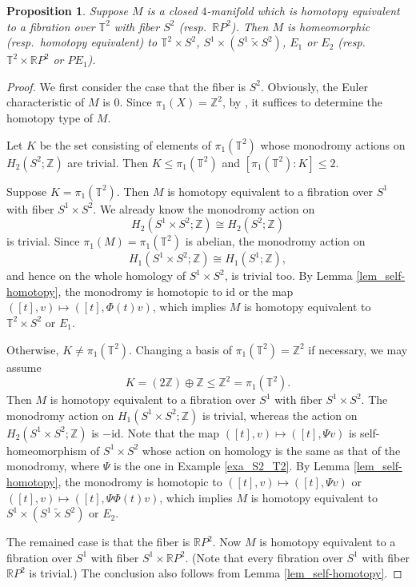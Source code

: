 \documentclass[12pt]{amsart}
\theoremstyle{plain}
\newtheorem{proposition}[theorem]{Proposition}
\theoremstyle{definition}
\theoremstyle{question}
\theoremstyle{remark}
\theoremstyle{assumption}
\numberwithin{equation}{section}
\theoremstyle{bigthm}
\begin{document}
\begin{proposition}\label{prop_S2_T2}
Suppose $M$ is a closed $4$-manifold which is homotopy equivalent to a fibration over $\mathbb{T}^{2}$ with fiber $S^{2}$ (resp.~$\mathbb{R}P^{2}$). Then $M$ is homeomorphic (resp.~homotopy equivalent) to $\mathbb{T}^{2} \times S^{2}$, $S^{1} \times (S^{1} \tilde{\times} S^{2})$, $E_{1}$ or $E_{2}$ (resp.~$\mathbb{T}^{2} \times \mathbb{R} P^{2}$ or $PE_{1}$).
\end{proposition}
\begin{proof}
We first consider the case that the fiber is $S^{2}$. Obviously, the Euler characteristic of $M$ is $0$. Since $\pi_{1} (X) = \mathbb{Z}^{2}$, by \cite[Theorem~6.11]{Hillman}, it suffices to determine the homotopy type of $M$.

Let $K$ be the set consisting of elements of $\pi_{1} (\mathbb{T}^{2})$ whose monodromy actions on $H_{2} (S^{2}; \mathbb{Z})$ are trivial. Then $K \le \pi_{1} (\mathbb{T}^{2})$ and $[\pi_{1} (\mathbb{T}^{2}): K] \le 2$.

Suppose $K = \pi_{1} (\mathbb{T}^{2})$. Then $M$ is homotopy equivalent to a fibration over $S^{1}$ with fiber $S^{1} \times S^{2}$. We already know the monodromy action on
\[
H_{2} (S^{1} \times S^{2}; \mathbb{Z}) \cong H_{2} (S^{2}; \mathbb{Z})
\]
is trivial. Since $\pi_{1} (M) = \pi_{1} (\mathbb{T}^{2})$ is abelian, the monodromy action on
\[
H_{1} (S^{1} \times S^{2}; \mathbb{Z}) \cong H_{1} (S^{1}; \mathbb{Z}),
\]
and hence on the whole homology of $S^{1} \times S^{2}$, is trivial too. By Lemma \ref{lem_self-homotopy}, the monodromy is homotopic to $\mathrm{id}$ or the map $([t], v) \mapsto ([t], \Phi (t) v)$, which implies $M$ is homotopy equivalent to $\mathbb{T}^{2} \times S^{2}$ or $E_{1}$.

Otherwise, $K \ne \pi_{1} (\mathbb{T}^{2})$. Changing a basis of $\pi_{1} (\mathbb{T}^{2}) = \mathbb{Z}^{2}$ if necessary, we may assume
\[
K = (2 \mathbb{Z}) \oplus \mathbb{Z} \le \mathbb{Z}^{2} = \pi_{1} (\mathbb{T}^{2}).
\]
Then $M$ is homotopy equivalent to a fibration over $S^{1}$ with fiber $S^{1} \times S^{2}$. The monodromy action on $H_{1} (S^{1} \times S^{2}; \mathbb{Z})$ is trivial, whereas the action on $H_{2} (S^{1} \times S^{2}; \mathbb{Z})$ is $-\mathrm{id}$. Note that the map $([t],v) \mapsto ([t], \Psi v)$ is self-homeomorphism of $S^{1} \times S^{2}$ whose action on homology is the same as that of the monodromy, where $\Psi$ is the one in Example \ref{exa_S2_T2}. By Lemma \ref{lem_self-homotopy}, the monodromy is homotopic to $([t],v) \mapsto ([t], \Psi v)$ or $([t], v) \mapsto ([t], \Psi \Phi (t) v)$, which implies $M$ is homotopy equivalent to $S^{1} \times (S^{1} \tilde{\times} S^{2})$ or $E_{2}$.

The remained case is that the fiber is $\mathbb{R}P^{2}$. Now $M$ is homotopy equivalent to a fibration over $S^{1}$ with fiber $S^{1} \times \mathbb{R}P^{2}$. (Note that every fibration over $S^{1}$ with fiber $\mathbb{R}P^{2}$ is trivial.) The conclusion also follows from Lemma \ref{lem_self-homotopy}.
\end{proof}
\end{document}
